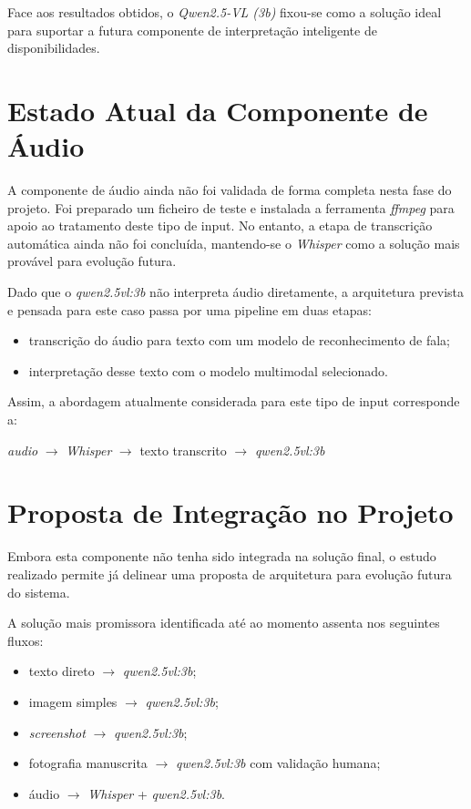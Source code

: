 Face aos resultados obtidos, o \textit{Qwen2.5-VL (3b)} fixou-se como a solução ideal para suportar a futura componente de interpretação inteligente de disponibilidades.


\section{Estado Atual da Componente de Áudio}

A componente de áudio ainda não foi validada de forma completa nesta fase do projeto.
Foi preparado um ficheiro de teste e instalada a ferramenta \textit{ffmpeg} para apoio ao tratamento deste tipo de input.
No entanto, a etapa de transcrição automática ainda não foi concluída, mantendo-se o \textit{Whisper} como a solução mais provável para evolução futura.

Dado que o \textit{qwen2.5vl:3b} não interpreta áudio diretamente, a arquitetura prevista e pensada para este caso passa por uma pipeline em duas etapas:

\begin{itemize}
    \item transcrição do áudio para texto com um modelo de reconhecimento de fala;
    \item interpretação desse texto com o modelo multimodal selecionado.
\end{itemize}

Assim, a abordagem atualmente considerada para este tipo de input corresponde a:

\begin{center}
    \textit{audio} $\rightarrow$ \textit{Whisper} $\rightarrow$ texto transcrito $\rightarrow$ \textit{qwen2.5vl:3b}
\end{center}

\section{Proposta de Integração no Projeto}

Embora esta componente não tenha sido integrada na solução final, o estudo realizado permite já delinear uma proposta de arquitetura para evolução futura do sistema.

A solução mais promissora identificada até ao momento assenta nos seguintes fluxos:

\begin{itemize}
    \item texto direto $\rightarrow$ \textit{qwen2.5vl:3b};
    \item imagem simples $\rightarrow$ \textit{qwen2.5vl:3b};
    \item \textit{screenshot} $\rightarrow$ \textit{qwen2.5vl:3b};
    \item fotografia manuscrita $\rightarrow$ \textit{qwen2.5vl:3b} com validação humana;
    \item áudio $\rightarrow$ \textit{Whisper} + \textit{qwen2.5vl:3b}.
\end{itemize}

